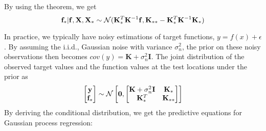 By using the theorem, we get
$${\mathbf{f}}_*|{\mathbf{f}}, \mathbf{X}, \mathbf{X}_*\sim \mathcal{N}(\mathbf{K}_*^T\mathbf{K}^{-1}{\mathbf{f}}, \mathbf{K}_{**}-\mathbf{K}_*^T\mathbf{K}^{-1}\mathbf{K}_{*})$$

In practice, we typically have noisy estimations of target functions, $y = f(x)+\epsilon$. By assuming the i.i.d., Gaussian noise with variance $\sigma_n^2$, the prior on these noisy observations then becomes $cov(y) = \mathbf{K}+\sigma_n^2\mathbf{I}$. The joint distribution of the observed target values and the function values at the test locations under the prior as 
\begin{align*}
	\begin{bmatrix}
		{\mathbf{y}}\\
		{\mathbf{f}}_*
	\end{bmatrix} \sim \mathcal{N}
	\begin{bmatrix}
		\mathbf{0}, \begin{bmatrix}
			\mathbf{K}+\sigma_n^2\mathbf{I} & \mathbf{K}_*\\
			\mathbf{K}_*^T & \mathbf{K}_{**}
		\end{bmatrix}
	\end{bmatrix}
\end{align*}
By deriving the conditional distribution, we get the predictive equations for Gaussian process regression:






